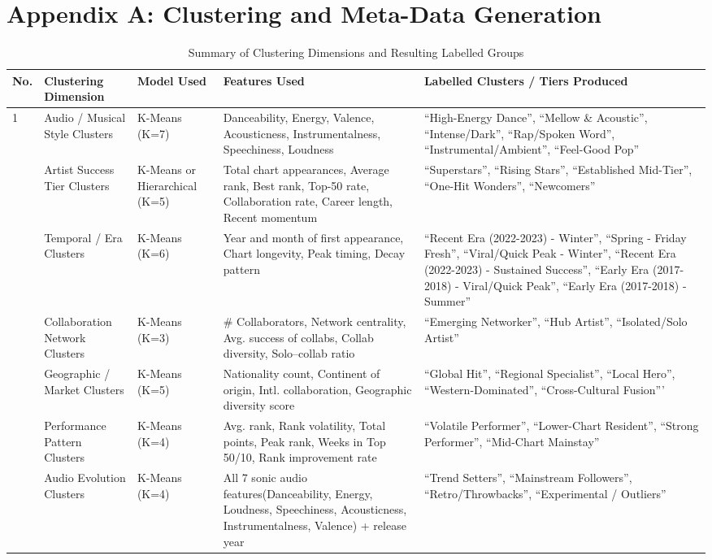 \documentclass{article}
\begin{document}
\section*{Appendix A: Clustering and Meta-Data Generation}
\begin{table}[htbp]
\centering
\caption{Summary of Clustering Dimensions and Resulting Labelled Groups}
\begin{tabular}{p{0.3cm} p{2.8cm} p{1.8cm} p{4.5cm} p{4.2cm}}
\toprule
\textbf{No.} & \textbf{Clustering Dimension} & \textbf{Model Used} & \textbf{Features Used} & \textbf{Labelled Clusters / Tiers Produced} \\
\midrule
1 & Audio / Musical Style Clusters & K-Means (K=7) & Danceability, Energy, Valence, Acousticness, Instrumentalness, Speechiness, Loudness & ``High-Energy Dance'', ``Mellow \& Acoustic'', ``Intense/Dark'', ``Rap/Spoken Word'', ``Instrumental/Ambient'', ``Feel-Good Pop'' \\
\addlinespace
2 & Artist Success Tier Clusters & K-Means or Hierarchical (K=5) & Total chart appearances, Average rank, Best rank, Top-50 rate, Collaboration rate, Career length, Recent momentum & ``Superstars'', ``Rising Stars'', ``Established Mid-Tier'', ``One-Hit Wonders'', ``Newcomers'' \\
\addlinespace
3 & Temporal / Era Clusters & K-Means (K=6) & Year and month of first appearance, Chart longevity, Peak timing, Decay pattern & ``Recent Era (2022-2023) - Winter'', ``Spring - Friday Fresh'', ``Viral/Quick Peak - Winter'', ``Recent Era (2022-2023) - Sustained Success'', ``Early Era (2017-2018) - Viral/Quick Peak'', ``Early Era (2017-2018) - Summer'' \\
\addlinespace
4 & Collaboration Network Clusters & K-Means (K=3) & \# Collaborators, Network centrality, Avg. success of collabs, Collab diversity, Solo–collab ratio & ``Emerging Networker'', ``Hub Artist'', ``Isolated/Solo Artist'' \\
\addlinespace
5 & Geographic / Market Clusters & K-Means (K=5) & Nationality count, Continent of origin, Intl. collaboration, Geographic diversity score & ``Global Hit'', ``Regional Specialist'', ``Local Hero'', ``Western-Dominated'', ``Cross-Cultural Fusion''' \\
\addlinespace
6 & Performance Pattern Clusters & K-Means (K=4) & Avg. rank, Rank volatility, Total points, Peak rank, Weeks in Top 50/10, Rank improvement rate & ``Volatile Performer'', ``Lower-Chart Resident'', ``Strong Performer'', ``Mid-Chart Mainstay'' \\
\addlinespace
7 & Audio Evolution Clusters & K-Means (K=4) & All 7 sonic audio features(Danceability, Energy, Loudness, Speechiness, Acousticness, Instrumentalness, Valence) + release year & ``Trend Setters'', ``Mainstream Followers'', ``Retro/Throwbacks'', ``Experimental / Outliers'' \\
\bottomrule
\end{tabular}
\label{tab:clustering_summary}
\end{table}
\end{document}
